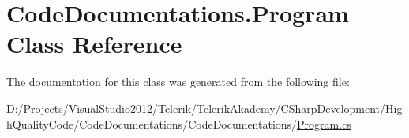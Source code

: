 \hypertarget{class_code_documentations_1_1_program}{\section{Code\-Documentations.\-Program Class Reference}
\label{class_code_documentations_1_1_program}
}


The documentation for this class was generated from the following file\-:\begin{DoxyCompactItemize}
\item 
D\-:/\-Projects/\-Visual\-Studio2012/\-Telerik/\-Telerik\-Akademy/\-C\-Sharp\-Development/\-High\-Quality\-Code/\-Code\-Documentations/\-Code\-Documentations/\hyperlink{_program_8cs}{Program.\-cs}\end{DoxyCompactItemize}
